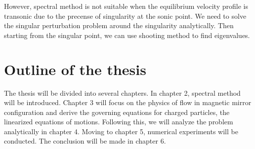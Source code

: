However, spectral method is not suitable when the equilibrium velocity profile is transonic due to the precense of singularity at the sonic point. We need to solve the singular perturbation problem around the singularity analytically. Then starting from the singular point, we can use shooting method to find eigenvalues.

\section{Outline of the thesis}
The thesis will be divided into several chapters. In chapter 2, spectral method will be introduced. Chapter 3 will focus on the physics of flow in magnetic mirror configuration and derive the governing equations for charged particles, the linearized equations of motions. Following this, we will analyze the problem analytically in chapter 4. Moving to chapter 5, numerical experiments will be conducted. The conclusion will be made in chapter 6.
